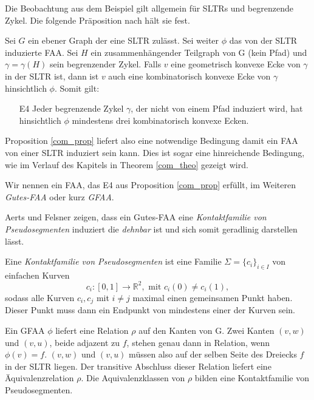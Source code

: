 Die Beobachtung aus dem Beispiel gilt allgemein für SLTRs und begrenzende Zykel. Die folgende Präposition nach \cite[Prop 2.2, Prop 2.4]{af13} hält sie fest.

\begin{proposition}\label{com_prop}
Sei $G$ ein ebener Graph der eine SLTR zulässt. Sei weiter $\phi$ das von der SLTR induzierte FAA. Sei $H$ ein zusammenhängender Teilgraph von G (kein Pfad) und $\gamma = \gamma(H)$ sein begrenzender Zykel. Falls $v$ eine geometrisch konvexe Ecke von $\gamma$ in der SLTR ist, dann ist $v$ auch eine kombinatorisch konvexe Ecke von $\gamma$ hinsichtlich $\phi$. Somit gilt:
\begin{itemize}
\item [E4] Jeder begrenzende Zykel $\gamma$, der nicht von einem Pfad induziert wird, hat hinsichtlich $\phi$ mindestens drei kombinatorisch konvexe Ecken.
\end{itemize}
\end{proposition}

Proposition \ref{com_prop} liefert also eine notwendige Bedingung damit ein FAA von einer SLTR induziert sein kann. Dies ist sogar eine hinreichende Bedingung, wie im Verlauf des Kapitels in Theorem \ref{com_theo} gezeigt wird. 

\begin{definition}
Wir nennen ein FAA, das E4 aus Proposition \ref{com_prop} erfüllt, im Weiteren \textit{Gutes-FAA} oder kurz \textit{GFAA}.
\end{definition}

Aerts und Felsner zeigen, dass ein Gutes-FAA eine \textit{Kontaktfamilie von Pseudosegmenten} induziert die \textit{dehnbar} ist und sich somit geradlinig darstellen lässt.

\begin{definition}
Eine \textit{Kontaktfamilie von Pseudosegmenten} ist eine Familie $\Sigma = \{c_i\}_{i\in I}$ von einfachen Kurven $$c_i:[0,1] \to \mathbb{R}^2, \text{ mit } c_i(0) \neq c_i(1),$$ sodass alle Kurven $c_i,c_j$ mit $i \neq j$ maximal einen gemeinsamen Punkt haben. Dieser Punkt muss dann ein Endpunkt von mindestens einer der Kurven sein.
\end{definition}

Ein GFAA $\phi$ liefert eine Relation $\rho$ auf den Kanten von G. Zwei Kanten $(v,w)$ und $(v,u)$, beide adjazent zu $f$, stehen genau dann in Relation, wenn $\phi(v)=f$. $(v,w)$ und $(v,u)$ müssen also auf der selben Seite  des Dreiecks $f$ in der SLTR liegen. Der transitive Abschluss dieser Relation liefert eine Äquivalenzrelation $\rho$. Die Aquivalenzklassen von $\rho$ bilden eine Kontaktfamilie von Pseudosegmenten.

